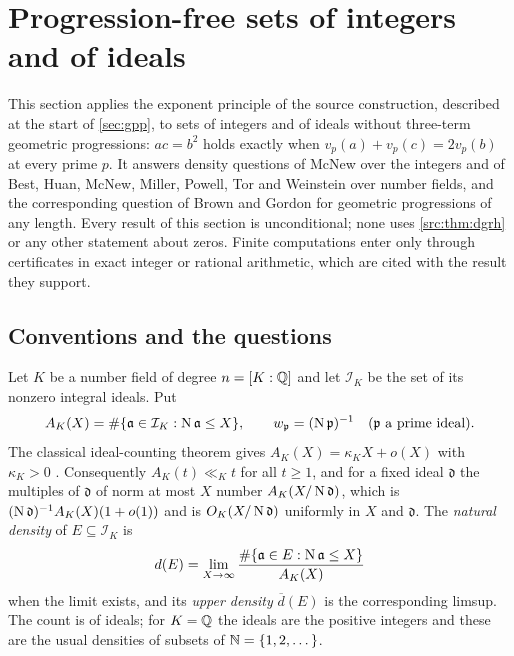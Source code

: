 \section{Progression-free sets of integers and of ideals}\label{sec:gpi}
\providecommand{\gpifile}[2][]{\begin{center}\footnotesize\artifact{#2}#1\end{center}}


This section applies the exponent principle of the source construction, described at the
start of \cref{sec:gpp}, to sets of integers and of ideals without three-term geometric
progressions: $ac=b^2$ holds exactly when $v_p(a)+v_p(c)=2v_p(b)$ at every prime $p$. It
answers density questions of McNew \cite{McNew2015Sets} over the integers and of Best, Huan,
McNew, Miller, Powell, Tor and Weinstein \cite{Best2017Geometric} over number fields, and the
corresponding question of Brown and Gordon \cite{BrownGordon1996Sequences} for geometric
progressions of any length. Every result of this section is unconditional; none uses
\cref{src:thm:dgrh} or any other statement about zeros. Finite computations enter only
through certificates in exact integer or rational arithmetic, which are cited with the result
they support.

\subsection{Conventions and the questions}\label{gpi:sec:setting}
{\raggedright{}}

Let $K$ be a number field of degree $n=[K:\mathbb{Q}]$ and let $\mathcal I_K$ be the set of its
nonzero integral ideals. Put
\[
 A_K(X)=\#\{\mathfrak a\in\mathcal I_K:\operatorname{N}\mathfrak a\le X\},\qquad
 w_{\mathfrak p}=(\operatorname{N}\mathfrak p)^{-1}\quad(\mathfrak p\text{ a prime ideal}).
\]
The classical ideal-counting theorem gives $A_K(X)=\kappa_KX+o(X)$ with $\kappa_K>0$
\cite{Murty2007Counting}. Consequently $A_K(t)\ll_Kt$ for all $t\ge1$, and for a fixed ideal
$\mathfrak d$ the multiples of $\mathfrak d$ of norm at most $X$ number
$A_K(X/\operatorname{N}\mathfrak d)$, which is $(\operatorname{N}\mathfrak d)^{-1}A_K(X)(1+o(1))$ and is
$O_K(X/\operatorname{N}\mathfrak d)$ uniformly in $X$ and $\mathfrak d$. The \emph{natural density} of
$E\subseteq\mathcal I_K$ is
\[
 d(E)=\lim_{X\to\infty}\frac{\#\{\mathfrak a\in E:\operatorname{N}\mathfrak a\le X\}}{A_K(X)}
\]
when the limit exists, and its \emph{upper density} $\overline d(E)$ is the corresponding
limsup. The count is of ideals; for $K=\mathbb{Q}$ the ideals are the positive integers and these are
the usual densities of subsets of $\mathbb{N}=\{1,2,\dots\}$.

